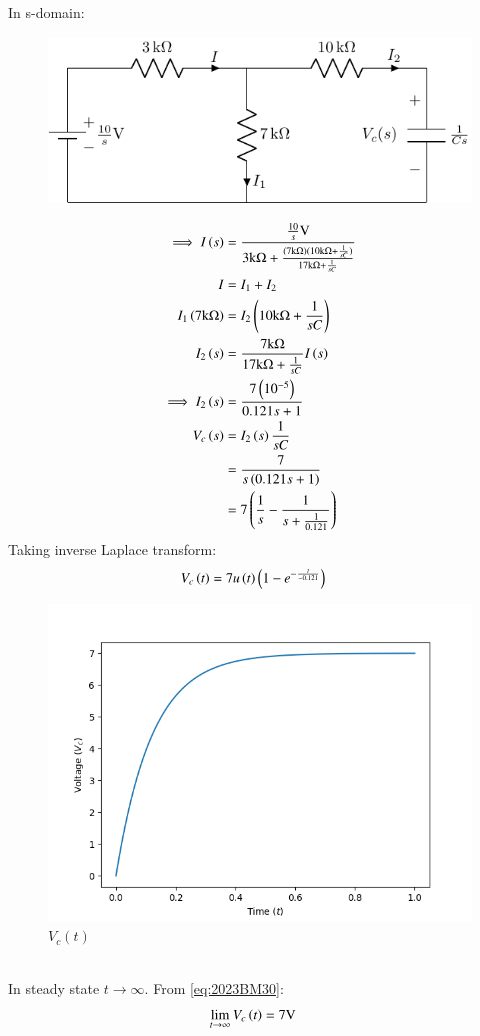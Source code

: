\documentclass[journal,12pt,twocolumn]{IEEEtran}
\theoremstyle{remark}
\begin{document}
In s-domain:
\begin{figure}[h!]
    \centering
    \includegraphics[width=\columnwidth]{2023/BM/30/figs/c_fig2.pdf}
\end{figure}
\begin{align}
\implies I\left(s\right) &= \frac{\frac{10}{s}\text{V}}{3\text{k}\ohm + \frac{(7\text{k}\ohm)(10\text{k}\ohm + \frac{1}{sC})}{17\text{k}\ohm + \frac{1}{sC}}} \\
I &= I_1 + I_2 \\
I_1\left(7\text{k}\ohm\right) &= I_2\left(10\text{k}\ohm + \frac{1}{sC}\right) \\
I_2\left(s\right) &= \frac{7\text{k}\ohm}{17\text{k}\ohm + \frac{1}{sC}}I\left(s\right) \\
\implies I_2\left(s\right) &= \frac{7\left(10^{-5}\right)}{0.121s + 1} \\
V_c\left(s\right) &= I_2\left(s\right)\frac{1}{sC} \\
&= \frac{7}{s\left(0.121s + 1\right)} \\
&= 7\left(\frac{1}{s} - \frac{1}{s + \frac{1}{0.121}}\right)
\end{align}
Taking inverse Laplace transform:
\begin{align}
V_c\brak{t} &= 7u\brak{t}\brak{1 - e^{-\frac{t}{-0.121}}} \label{eq:2023BM30}
\end{align}
\begin{figure}[h!]
\centering
\includegraphics[width=\columnwidth]{2023/BM/30/figs/plot.png}
\caption{$V_c(t)$}
\label{fig:2023BM30}
\end{figure}
\\
In steady state $t \to \infty$. From \eqref{eq:2023BM30}:
\begin{align}
\lim_{t\to\infty}V_c\left(t\right) &= 7\text{V}
\end{align}
\end{document}
